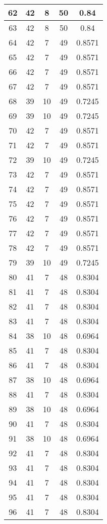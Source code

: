 \documentclass[letterpaper, 12pt]{article}
\begin{document}
\begin{longtable}{|c|c|c|c|c|}
\hline
62 & 42 & 8 & 50 & 0.84 \\
\hline
63 & 42 & 8 & 50 & 0.84 \\
\hline
64 & 42 & 7 & 49 & 0.8571 \\
\hline
65 & 42 & 7 & 49 & 0.8571 \\
\hline
66 & 42 & 7 & 49 & 0.8571 \\
\hline
67 & 42 & 7 & 49 & 0.8571 \\
\hline
68 & 39 & 10 & 49 & 0.7245 \\
\hline
69 & 39 & 10 & 49 & 0.7245 \\
\hline
70 & 42 & 7 & 49 & 0.8571 \\
\hline
71 & 42 & 7 & 49 & 0.8571 \\
\hline
72 & 39 & 10 & 49 & 0.7245 \\
\hline
73 & 42 & 7 & 49 & 0.8571 \\
\hline
74 & 42 & 7 & 49 & 0.8571 \\
\hline
75 & 42 & 7 & 49 & 0.8571 \\
\hline
76 & 42 & 7 & 49 & 0.8571 \\
\hline
77 & 42 & 7 & 49 & 0.8571 \\
\hline
78 & 42 & 7 & 49 & 0.8571 \\
\hline
79 & 39 & 10 & 49 & 0.7245 \\
\hline
80 & 41 & 7 & 48 & 0.8304 \\
\hline
81 & 41 & 7 & 48 & 0.8304 \\
\hline
82 & 41 & 7 & 48 & 0.8304 \\
\hline
83 & 41 & 7 & 48 & 0.8304 \\
\hline
84 & 38 & 10 & 48 & 0.6964 \\
\hline
85 & 41 & 7 & 48 & 0.8304 \\
\hline
86 & 41 & 7 & 48 & 0.8304 \\
\hline
87 & 38 & 10 & 48 & 0.6964 \\
\hline
88 & 41 & 7 & 48 & 0.8304 \\
\hline
89 & 38 & 10 & 48 & 0.6964 \\
\hline
90 & 41 & 7 & 48 & 0.8304 \\
\hline
91 & 38 & 10 & 48 & 0.6964 \\
\hline
92 & 41 & 7 & 48 & 0.8304 \\
\hline
93 & 41 & 7 & 48 & 0.8304 \\
\hline
94 & 41 & 7 & 48 & 0.8304 \\
\hline
95 & 41 & 7 & 48 & 0.8304 \\
\hline
96 & 41 & 7 & 48 & 0.8304 \\

\end{longtable}
\end{document}
